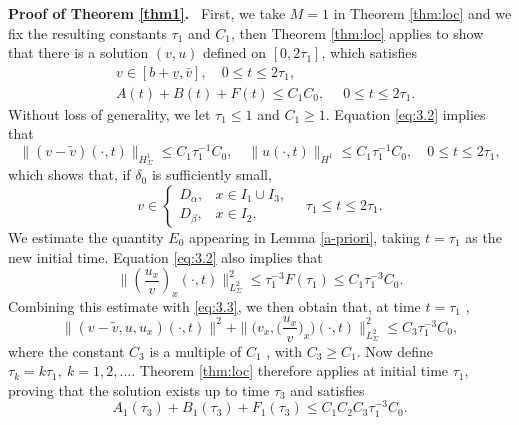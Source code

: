 \documentclass[a4paper,oneside,11pt]{article}
\numberwithin{equation}{section}
\begin{document}
\noindent\textbf{Proof of Theorem \ref{thm1}.}~
First, we take \({M} = 1\) in Theorem \ref{thm:loc} and we fix the resulting constants \({\tau }_{1}\) and \({C}_{1}\), then Theorem \ref{thm:loc}  applies to show that there is a solution \((v,u)\) defined on $[0,2\tau_1]$, which satisfies
\begin{align}
&v\in [b+\underline{v},\bar{v}] ,\quad 0\leq t\leq 2\tau_1, \label{eq:3.1}\\
&A(t)  + B(t)  + F(t)  \leq  {C}_{1}C_0 ,\quad\;0 \leq  t \leq  2{\tau }_{1}.\label{eq:3.2}
\end{align}
Without loss of generality, we let \({\tau }_{1} \leq  1\) and \({C}_{1} \geq  1\).
Equation \eqref{eq:3.2} implies that
\begin{equation}\label{eq:3.3}
	\|(v-\tilde{v})(\cdot,t)\|_{H^1_\Sigma}\leq C_1\tau_1^{-1}C_0,\quad \|u(\cdot,t)\|_{H^1}\leq C_1\tau_1^{-1}C_0,\quad 0\leq t\leq 2\tau_1,
\end{equation}
which shows that, if \({\delta }_{0}\) is sufficiently small,
\begin{equation}\label{eq:3.4}
	v \in 
\begin{cases}
D_\alpha, & x \in I_1 \cup I_3, \\
D_\beta, & x \in I_2,
\end{cases}  \quad \tau_1\leq t\leq 2\tau_1.
\end{equation}
We estimate the quantity \({E}_{0}\) appearing in Lemma \ref{a-priori}, taking \(t = {\tau }_{1}\) as the new initial time. Equation \eqref{eq:3.2} also implies that
\[
\|\left(\frac{u_x}{v}\right)_x(\cdot, t)\|_{L^2_\Sigma}^2\leq  {\tau }_{1}^{-3}F\left( {\tau }_{1}\right)  \leq  {C}_{1}{\tau }_{1}^{-3}C_0.
\]
Combining this estimate with \eqref{eq:3.3}, we then obtain that, at time \(t = {\tau }_{1}\) ,
\begin{equation}\label{eq:3.5}
	\|(v-\tilde{v},u,u_x)(\cdot,t)\|^2+\|\big(v_x,\big(\frac{u_x}{v}\big)_x\big)(\cdot, t)\|_{L^2_\Sigma}^2 \leq  {C}_{3}{\tau }_{1}^{-3}C_0,
\end{equation}
where the constant \({C}_{3}\) is a multiple of \({C}_{1}\) , with \({C}_{3} \geq  {C}_{1}\).
Now define \({\tau }_{k} = k{\tau }_{1},~k = 1,2,\ldots\). Theorem \ref{thm:loc} therefore applies at initial time \({\tau }_{1}\), proving that the solution exists up to time \({\tau }_{3}\) and satisfies
\begin{equation}\label{eq:3.6}
{A}_{1}\left( {\tau }_{3}\right)  + {B}_{1}\left( {\tau }_{3}\right)  + {F}_{1}\left( {\tau }_{3}\right)  \leq  {C}_{1}{C}_{2}{C}_{3}{\tau }_{1}^{-3}C_0.
\end{equation}
\end{document}

